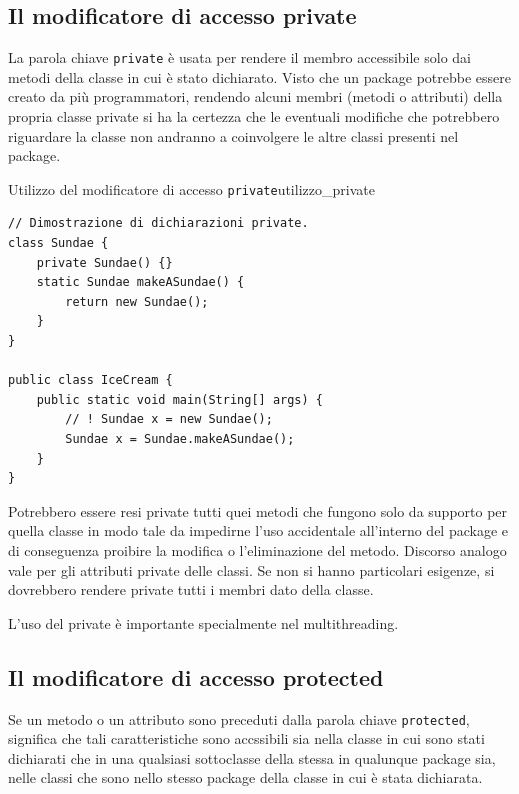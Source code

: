 \documentclass[12pt]{report}
\newcommand{\nmu}{}
\begin{document}
\subsection{Il modificatore di accesso private}
La parola chiave \texttt{private} è usata per rendere il membro accessibile solo dai metodi della classe in cui è stato dichiarato. Visto che un package potrebbe essere creato da più programmatori, rendendo alcuni membri (metodi o attributi) della propria classe private si ha la certezza che le eventuali modifiche che potrebbero riguardare la classe non andranno a coinvolgere le altre classi presenti nel package.
\begin{example}{\nmu Utilizzo del modificatore di accesso \texttt{private}}{utilizzo_private}
\begin{lstlisting}[style=javastyle]
// Dimostrazione di dichiarazioni private.
class Sundae {
	private Sundae() {}
	static Sundae makeASundae() {
		return new Sundae();
	}
}

public class IceCream {
	public static void main(String[] args) {
		// ! Sundae x = new Sundae();
		Sundae x = Sundae.makeASundae();
	}
}
\end{lstlisting}
\end{example}
Potrebbero essere resi private tutti quei metodi che fungono solo da supporto per quella classe in modo tale da impedirne l'uso accidentale all'interno del package e di conseguenza proibire la modifica o l'eliminazione del metodo. Discorso analogo vale per gli attributi private delle classi. Se non si hanno particolari esigenze, si dovrebbero rendere private tutti i membri dato della classe.

L'uso del private è importante specialmente nel multithreading.
\subsection{Il modificatore di accesso protected}
Se un metodo o un attributo sono preceduti dalla parola chiave \texttt{protected}, significa che tali caratteristiche sono accssibili sia nella classe in cui sono stati dichiarati che in una qualsiasi sottoclasse della stessa in qualunque package sia, nelle classi che sono nello stesso package della classe in cui è stata dichiarata.
\end{document}
